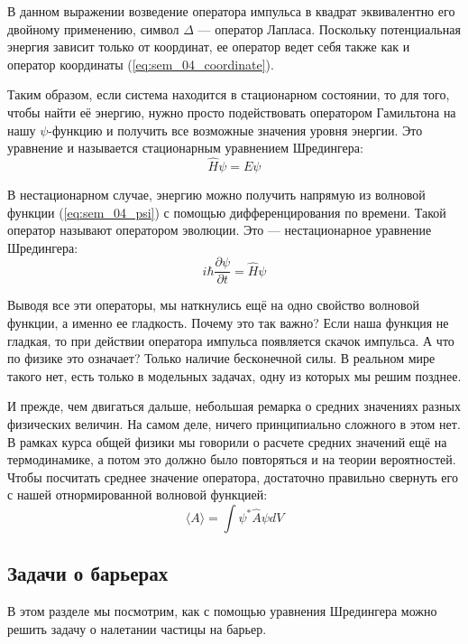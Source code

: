 \documentclass[12pt]{article}
\begin{document}
В данном выражении возведение оператора импульса в квадрат эквивалентно его двойному применению, символ $\Delta$ --- оператор Лапласа. Поскольку потенциальная энергия зависит только от координат, ее оператор ведет себя также как и оператор координаты (\ref{eq:sem_04_coordinate}). 

Таким образом, если система находится в стационарном состоянии, то для того, чтобы найти её энергию, нужно просто подействовать оператором Гамильтона на нашу $\psi$-функцию и получить все возможные значения уровня энергии. Это уравнение и называется стационарным уравнением Шредингера:
\begin{equation}
\label{eq:sem_04_schrodinger}
    \hat{H}\psi = E\psi
\end{equation}

В нестационарном случае, энергию можно получить напрямую из волновой функции (\ref{eq:sem_04_psi}) с помощью дифференцирования по времени. Такой оператор называют оператором эволюции. Это --- нестационарное уравнение Шредингера:
\begin{equation*}
    i\hbar\dfrac{\partial\psi}{\partial t} = \hat{H}\psi
\end{equation*}

Выводя все эти операторы, мы наткнулись ещё на одно свойство волновой функции, а именно ее гладкость. Почему это так важно? Если наша функция не гладкая, то при действии оператора импульса появляется скачок импульса. А что по физике это означает? Только наличие бесконечной силы. В реальном мире такого нет, есть только в модельных задачах, одну из которых мы решим позднее.

И прежде, чем двигаться дальше, небольшая ремарка о средних значениях разных физических величин. На самом деле, ничего принципиально сложного в этом нет. В рамках курса общей физики мы говорили о расчете средних значений ещё на термодинамике, а потом это должно было повторяться и на теории вероятностей. Чтобы посчитать среднее значение оператора, достаточно правильно свернуть его с нашей отнормированной волновой функцией:
\begin{equation*}
    \langle A\rangle = \int\psi^*\hat{A}\psi dV
\end{equation*}

\subsection{Задачи о барьерах}
В этом разделе мы посмотрим, как с помощью уравнения Шредингера можно решить задачу о налетании частицы на барьер. 
\end{document}
